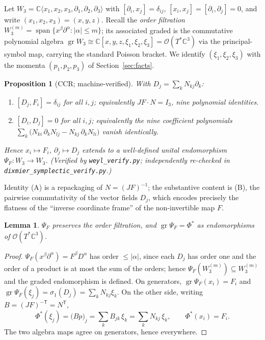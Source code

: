 \documentclass[11pt]{amsart}
\newcommand{\CC}{\mathbb{C}}
\newcommand{\W}{W}
\newcommand{\gr}{\operatorname{gr}}
\theoremstyle{plain}
\newtheorem{lemma}[theorem]{Lemma}
\newtheorem{proposition}[theorem]{Proposition}
\theoremstyle{definition}
\theoremstyle{remark}
\begin{document}
Let $\W_{3}=\CC\langle x_{1},x_{2},x_{3},\partial_{1},\partial_{2},
\partial_{3}\rangle$ with $[\partial_{i},x_{j}]=\delta_{ij}$,
$[x_{i},x_{j}]=[\partial_{i},\partial_{j}]=0$, and write
$(x_{1},x_{2},x_{3})=(x,y,z)$. Recall the \emph{order filtration}
$\W_{3}^{(m)}=\operatorname{span}\{x^{\beta}\partial^{\alpha}:
|\alpha|\le m\}$; its associated graded is the commutative polynomial
algebra $\gr\W_{3}\cong\CC[x,y,z,\xi_{1},\xi_{2},\xi_{3}]
=\mathcal{O}(T^{*}\CC^{3})$ via the principal-symbol map, carrying the
standard Poisson bracket. We identify $(\xi_{1},\xi_{2},\xi_{3})$ with the
momenta $(p_{1},p_{2},p_{3})$ of Section~\ref{sec:facts}.

\begin{proposition}[CCR; machine-verified]\label{prop:ccr}
With $D_{j}=\sum_{k}N_{kj}\partial_{k}$:
\begin{enumerate}
\item[(A)] $[D_{j},F_{i}]=\delta_{ij}$ for all $i,j$; equivalently
$JF\cdot N=I_{3}$, nine polynomial identities.
\item[(B)] $[D_{i},D_{j}]=0$ for all $i,j$; equivalently the nine
coefficient polynomials
$\sum_{k}\bigl(N_{ki}\,\partial_{k}N_{lj}-N_{kj}\,\partial_{k}N_{li}\bigr)$
vanish identically.
\end{enumerate}
Hence $x_{i}\mapsto F_{i}$, $\partial_{j}\mapsto D_{j}$ extends to a
well-defined unital endomorphism $\Psi_{F}\colon\W_{3}\to\W_{3}$.
\emph{(Verified by \texttt{weyl\_verify.py}; independently re-checked in
\texttt{dixmier\_symplectic\_verify.py}.)}
\end{proposition}

Identity (A) is a repackaging of $N=(JF)^{-1}$; the substantive content is
(B), the pairwise commutativity of the vector fields $D_{j}$, which
encodes precisely the flatness of the ``inverse coordinate frame'' of the
non-invertible map $F$.

\begin{lemma}\label{lem:gr}
$\Psi_{F}$ preserves the order filtration, and
$\gr\Psi_{F}=\Phi^{*}$ as endomorphisms of
$\mathcal{O}(T^{*}\CC^{3})$.
\end{lemma}

\begin{proof}
$\Psi_{F}(x^{\beta}\partial^{\alpha})=F^{\beta}D^{\alpha}$ has order
$\le|\alpha|$, since each $D_{j}$ has order one and the order of a
product is at most the sum of the orders; hence $\Psi_{F}(\W_{3}^{(m)})\subseteq\W_{3}^{(m)}$ and
the graded endomorphism is defined. On generators,
$\gr\Psi_{F}(x_{i})=F_{i}$ and
$\gr\Psi_{F}(\xi_{j})=\sigma_{1}(D_{j})=\sum_{k}N_{kj}\xi_{k}$. On the
other side, writing $B=(JF)^{-\mathsf T}=N^{\mathsf T}$,
\[
\Phi^{*}(\xi_{j})=\bigl(Bp\bigr)_{j}=\sum_{k}B_{jk}\,\xi_{k}
=\sum_{k}N_{kj}\,\xi_{k},\qquad \Phi^{*}(x_{i})=F_{i}.
\]
The two algebra maps agree on generators, hence everywhere.
\end{proof}
\end{document}
